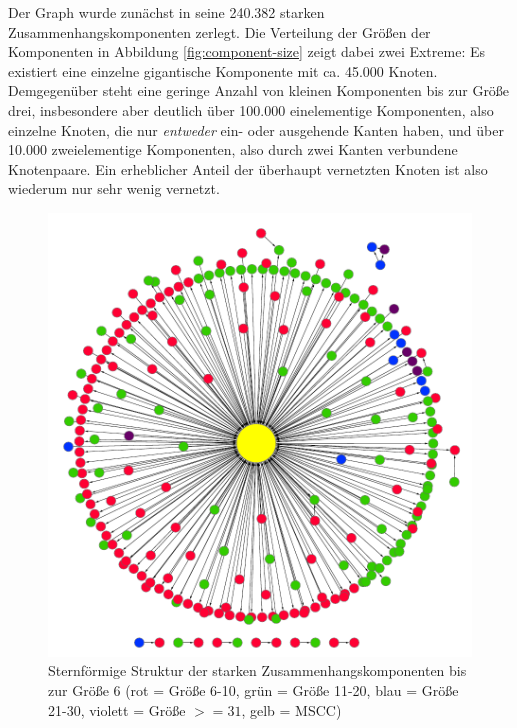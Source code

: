 Der Graph wurde zunächst in seine 240.382 starken
Zusammenhangskomponenten zerlegt. Die Verteilung der
Größen der Komponenten in Abbildung \ref{fig:component-size} zeigt dabei
zwei Extreme: Es existiert eine einzelne gigantische Komponente mit
ca. 45.000 Knoten. Demgegenüber steht eine geringe Anzahl von kleinen
Komponenten bis zur Größe drei, insbesondere aber deutlich über 100.000
einelementige Komponenten, also einzelne Knoten, die nur
\emph{entweder} ein- oder ausgehende Kanten haben, und über 10.000
zweielementige Komponenten, also durch zwei Kanten verbundene
Knotenpaare. Ein erheblicher Anteil der überhaupt vernetzten Knoten
ist also wiederum nur sehr wenig vernetzt.

\begin{figure}[th!]
  \centering
  \includegraphics[scale=0.7]{images/component-metagraph-8.pdf}
  \caption{Sternförmige Struktur der starken
    Zusammenhangskomponenten bis zur Größe 6 (rot = Größe 6-10, grün
    = Größe 11-20, blau = Größe 21-30, violett = Größe $>= 31$,
    gelb = MSCC)}
  \label{fig:komponenten-struktur}
\end{figure}

